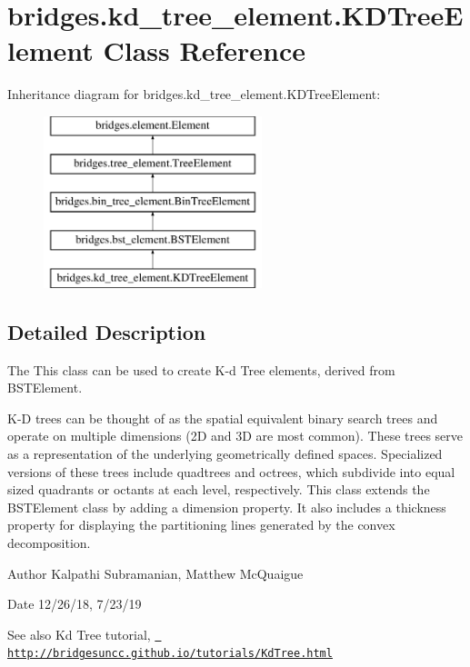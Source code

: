 \hypertarget{classbridges_1_1kd__tree__element_1_1_k_d_tree_element}{}\section{bridges.\+kd\+\_\+tree\+\_\+element.\+K\+D\+Tree\+Element Class Reference}
\label{classbridges_1_1kd__tree__element_1_1_k_d_tree_element}
Inheritance diagram for bridges.\+kd\+\_\+tree\+\_\+element.\+K\+D\+Tree\+Element\+:\begin{figure}[H]
\begin{center}
\leavevmode
\includegraphics[height=5.000000cm]{classbridges_1_1kd__tree__element_1_1_k_d_tree_element}
\end{center}
\end{figure}


\subsection{Detailed Description}
The This class can be used to create K-\/d Tree elements, derived from B\+S\+T\+Element. 

K-\/D trees can be thought of as the spatial equivalent binary search trees and operate on multiple dimensions (2D and 3D are most common). These trees serve as a representation of the underlying geometrically defined spaces. Specialized versions of these trees include quadtrees and octrees, which subdivide into equal sized quadrants or octants at each level, respectively. This class extends the B\+S\+T\+Element class by adding a dimension property. It also includes a thickness property for displaying the partitioning lines generated by the convex decomposition.

\begin{DoxyAuthor}{Author}
Kalpathi Subramanian, Matthew Mc\+Quaigue 
\end{DoxyAuthor}
\begin{DoxyDate}{Date}
12/26/18, 7/23/19
\end{DoxyDate}
\begin{DoxySeeAlso}{See also}
Kd Tree tutorial, \href{http://bridgesuncc.github.io/tutorials/KdTree.html}{\texttt{ http\+://bridgesuncc.\+github.\+io/tutorials/\+Kd\+Tree.\+html}} 
\end{DoxySeeAlso}
